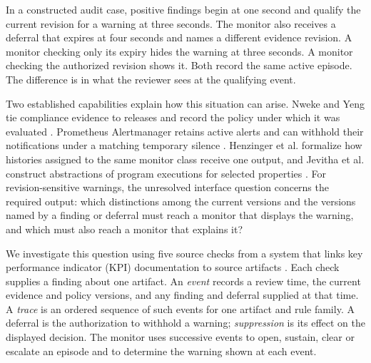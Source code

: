 \documentclass[preprint,11pt]{elsarticle}
\begin{document}
In a constructed audit case, positive findings begin at one second and qualify the current revision for a warning at three seconds. The monitor also receives a deferral that expires at four seconds and names a different evidence revision. A monitor checking only its expiry hides the warning at three seconds. A monitor checking the authorized revision shows it. Both record the same active episode. The difference is in what the reviewer sees at the qualifying event.

Two established capabilities explain how this situation can arise. Nweke and Yeng tie compliance evidence to releases and record the policy under which it was evaluated \cite{nwekeyeng2026compliance}. Prometheus Alertmanager retains active alerts and can withhold their notifications under a matching temporary silence \cite{prometheus2026alertmanager}. Henzinger et al. formalize how histories assigned to the same monitor class receive one output, and Jevitha et al. construct abstractions of program executions for selected properties \cite{henzinger2022abstract,jevitha2024abstract}. For revision-sensitive warnings, the unresolved interface question concerns the required output: which distinctions among the current versions and the versions named by a finding or deferral must reach a monitor that displays the warning, and which must also reach a monitor that explains it?

We investigate this question using five source checks from a system that links key performance indicator (KPI) documentation to source artifacts \cite{mouawad2026architecture}. Each check supplies a finding about one artifact. An \emph{event} records a review time, the current evidence and policy versions, and any finding and deferral supplied at that time. A \emph{trace} is an ordered sequence of such events for one artifact and rule family. A deferral is the authorization to withhold a warning; \emph{suppression} is its effect on the displayed decision. The monitor uses successive events to open, sustain, clear or escalate an episode and to determine the warning shown at each event.
\end{document}
